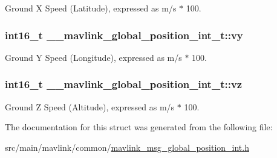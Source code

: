 Ground X Speed (Latitude), expressed as m/s $\ast$ 100. 

\hypertarget{struct____mavlink__global__position__int__t_a89734a8b924f059f9e634233ce021cd3}{
\subsubsection[{vy}]{\setlength{\rightskip}{0pt plus 5cm}int16\+\_\+t \+\_\+\+\_\+mavlink\+\_\+global\+\_\+position\+\_\+int\+\_\+t\+::vy}}\label{struct____mavlink__global__position__int__t_a89734a8b924f059f9e634233ce021cd3}


Ground Y Speed (Longitude), expressed as m/s $\ast$ 100. 

\hypertarget{struct____mavlink__global__position__int__t_ac476cea996cb642f139a93fc7f5ed2a4}{
\subsubsection[{vz}]{\setlength{\rightskip}{0pt plus 5cm}int16\+\_\+t \+\_\+\+\_\+mavlink\+\_\+global\+\_\+position\+\_\+int\+\_\+t\+::vz}}\label{struct____mavlink__global__position__int__t_ac476cea996cb642f139a93fc7f5ed2a4}


Ground Z Speed (Altitude), expressed as m/s $\ast$ 100. 



The documentation for this struct was generated from the following file\+:\begin{DoxyCompactItemize}
\item 
src/main/mavlink/common/\hyperlink{mavlink__msg__global__position__int_8h}{mavlink\+\_\+msg\+\_\+global\+\_\+position\+\_\+int.\+h}\end{DoxyCompactItemize}
